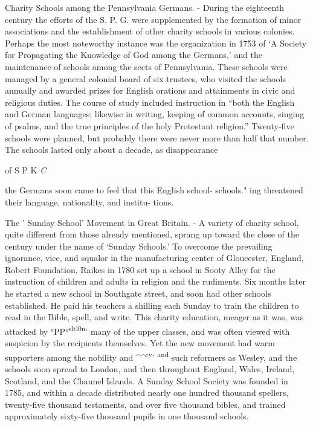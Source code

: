 \documentclass[]{book}
\begin{document}
Charity Schools among the Pennsylvania Germans. - During the eighteenth century the efforts of the S. P. G. were supplemented by the formation of minor associations and the establishment of other charity schools in various colonies. Perhaps the most noteworthy instance was the organization in 1753 of `A Society for Propagating the Knowledge of God among the Germans,' and the maintenance of schools among the sects of Pennsylvania. These schools were managed by a general colonial board of six trustees, who visited the schools annually and awarded prizes for English orations and attainments in civic and religious duties. The course of study included instruction in ``both the English and German languages; likewise in writing, keeping of common accounts, singing of psalms, and the true principles of the holy Protestant religion.'' Twenty-five schools were planned, but probably there were never more than half\protect\hypertarget{ch20.xmlux5cux23para.296.1.0.box.132.228.1247.38.q.70}{}{ that number. The schools lasted only about a decade, as disappearance}

of S P K \emph{C}

the Germans soon came to feel that this English school- schools." ing threatened their language, nationality, and institu- tions.

The ' Sunday School' Movement in Great Britain. - A variety of charity school, quite different from those already mentioned, sprang up toward the close of the century under the name of `Sunday Schools.' To overcome the prevailing ignorance, vice, and squalor in the manufacturing center of Gloucester, England, Robert Foundation, Raikes in 1780 set up a school in Sooty Alley for the instruction of children and adults in religion and the rudiments. Six months later he started a new school in Southgate street, and soon had other schools established. He paid his teachers a shilling each Sunday to train the children to read in the Bible, spell, and write. This charity education, meager as it was, was attacked by °PP°\textsuperscript{sltl0n}' many of the upper classes, and was often viewed with suspicion by the recipients themselves. Yet the new movement had warm supporters among the nobility and \^{}\^{}\textsuperscript{cy}' \textsuperscript{and} such reformers as Wesley, and the schools soon spread to London, and then throughout England, Wales, Ireland, Scotland, and the Channel Islands. A Sunday School Society was founded in 1785, and within a decade distributed nearly one hundred thousand spellers, twenty-five thousand testaments, and over five thousand bibles, and trained approximately sixty-five thousand pupils in one thousand schools.
\end{document}
